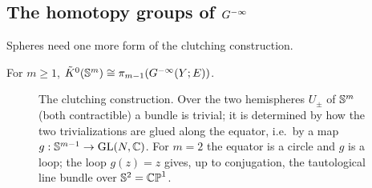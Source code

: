 \subsection{The homotopy groups of \texorpdfstring{$G^{-\infty}$}{G}}
Spheres need one more form of the clutching construction.

\begin{lemma}\label{bott:lem:sphere-clutching}
  For $m\ge1$, $\tilde K^0(\mathbb{S}^m)\cong\pi_{m-1}(G^{-\infty}(Y;E))$.
\end{lemma}

\begin{figure}[ht]
\centering
{}
\caption{The clutching construction. Over the two hemispheres $U_\pm$ of
$\mathbb{S}^m$ (both contractible) a bundle is trivial; it is determined by how the
two trivializations are glued along the equator, i.e.\ by a map
$g:\mathbb{S}^{m-1}\to\operatorname{GL}(N,\mathbb{C})$. For $m=2$ the equator is a circle and $g$ is a
loop; the loop $g(z)=z$ gives, up to conjugation, the tautological line bundle
over $\mathbb{S}^2=\mathbb{CP}^1$.}
\label{bott:fig:clutching}
\end{figure}
